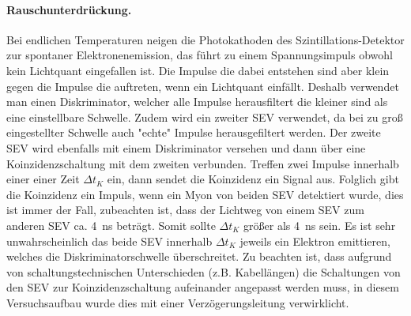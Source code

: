 \paragraph{Rauschunterdrückung.}
Bei endlichen Temperaturen neigen die Photokathoden des Szintillations-Detektor zur spontaner Elektronenemission, 
das führt zu einem Spannungsimpuls obwohl kein Lichtquant eingefallen ist. Die Impulse die dabei entstehen sind 
aber klein gegen die Impulse die auftreten, wenn ein Lichtquant einfällt. Deshalb verwendet man einen 
Diskriminator, welcher alle Impulse herausfiltert die kleiner sind als eine einstellbare Schwelle. Zudem wird 
ein zweiter SEV verwendet, da bei zu groß eingestellter Schwelle auch "echte" Impulse herausgefiltert werden. 
Der zweite SEV wird ebenfalls mit einem Diskriminator versehen und dann über eine Koinzidenzschaltung mit dem 
zweiten verbunden. Treffen zwei Impulse innerhalb einer einer Zeit $\Delta t_K$ ein, dann sendet die 
Koinzidenz ein Signal aus. Folglich gibt die Koinzidenz ein Impuls, wenn ein Myon von beiden SEV detektiert 
wurde, dies ist immer der Fall, zubeachten ist, dass der Lichtweg von einem SEV zum anderen SEV ca. 
\SI{4}{\nano\second} beträgt. Somit sollte $\Delta t_K$ größer als \SI{4}{\nano\second} sein. Es ist sehr 
unwahrscheinlich das beide SEV innerhalb $\Delta t_K$ jeweils ein Elektron emittieren, welches die 
Diskriminatorschwelle überschreitet. Zu beachten ist, dass aufgrund von schaltungstechnischen Unterschieden 
(z.B. Kabellängen) die Schaltungen von den SEV zur Koinzidenzschaltung aufeinander angepasst werden muss, in 
diesem Versuchsaufbau wurde dies mit einer Verzögerungsleitung verwirklicht.



